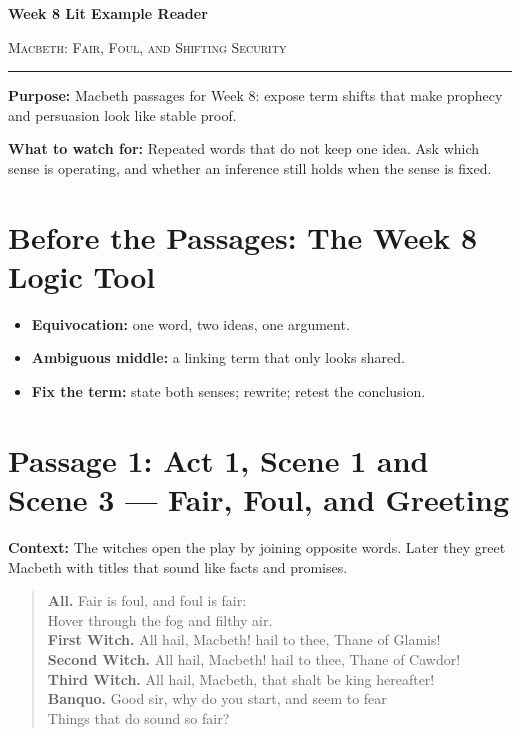 \documentclass[12pt]{article}
\newenvironment{playpassage}{\begin{quote}\small\setlength{\parskip}{0.12em}\setlength{\parindent}{0pt}}{\end{quote}}
\newcommand{\speaker}[1]{\textbf{#1.}}
\begin{document}
\begin{center}
{\LARGE\bfseries Week 8 Lit Example Reader}\par\vspace{0.02em}
{\large\scshape Macbeth: Fair, Foul, and Shifting Security}\par\vspace{0.08em}
\rule{0.78\textwidth}{0.5pt}
\end{center}

\textbf{Purpose:} Macbeth passages for Week 8: expose term shifts that make prophecy and persuasion look like stable proof.

\textbf{What to watch for:} Repeated words that do not keep one idea. Ask which sense is operating, and whether an inference still holds when the sense is fixed.

\section*{Before the Passages: The Week 8 Logic Tool}

\begin{itemize}[leftmargin=1.3em,itemsep=0.08em,topsep=0.1em,parsep=0.04em]
\item \textbf{Equivocation:} one word, two ideas, one argument.
\item \textbf{Ambiguous middle:} a linking term that only looks shared.
\item \textbf{Fix the term:} state both senses; rewrite; retest the conclusion.
\end{itemize}

\section*{Passage 1: Act 1, Scene 1 and Scene 3 --- Fair, Foul, and Greeting}

\textbf{Context:} The witches open the play by joining opposite words. Later they greet Macbeth with titles that sound like facts and promises.

\begin{playpassage}
\speaker{All} Fair is foul, and foul is fair:\\
Hover through the fog and filthy air.\\
\speaker{First Witch} All hail, Macbeth! hail to thee, Thane of Glamis!\\
\speaker{Second Witch} All hail, Macbeth! hail to thee, Thane of Cawdor!\\
\speaker{Third Witch} All hail, Macbeth, that shalt be king hereafter!\\
\speaker{Banquo} Good sir, why do you start, and seem to fear\\
Things that do sound so fair?
\end{playpassage}
\end{document}
